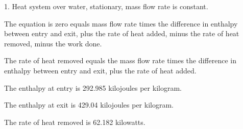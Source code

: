 1. Heat system over water, stationary, mass flow rate is constant.

The equation is zero equals mass flow rate times the difference in enthalpy between entry and exit, plus the rate of heat added, minus the rate of heat removed, minus the work done.

The rate of heat removed equals the mass flow rate times the difference in enthalpy between entry and exit, plus the rate of heat added.

The enthalpy at entry is 292.985 kilojoules per kilogram.

The enthalpy at exit is 429.04 kilojoules per kilogram.

The rate of heat removed is 62.182 kilowatts.